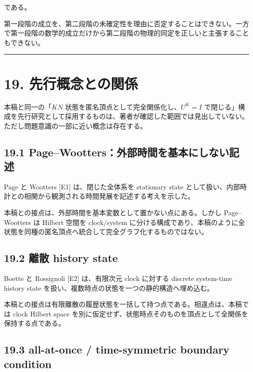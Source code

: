 \documentclass[
  a4paper,
]{ltjsarticle}
\begin{document}
である。

第一段階の成立を、第二段階の未確定性を理由に否定することはできない。一方で第一段階の数学的成立だけから第二段階の物理的同定を正しいと主張することもできない。

\begin{center}\rule{0.5\linewidth}{0.5pt}\end{center}

\section{19.
先行概念との関係}\label{ux5148ux884cux6982ux5ff5ux3068ux306eux95a2ux4fc2}

本稿と同一の「\(KN\) 状態を匿名頂点として完全関係化し、\(U^K=I\)
で閉じる」構成を先行研究として採用するものは、著者が確認した範囲では見出していない。ただし問題意識の一部に近い概念は存在する。

\subsection{19.1
Page--Wootters：外部時間を基本にしない記述}\label{pagewoottersux5916ux90e8ux6642ux9593ux3092ux57faux672cux306bux3057ux306aux3044ux8a18ux8ff0}

Page と Wootters {[}E1{]} は、閉じた全体系を stationary state
として扱い、内部時計との相関から観測される時間発展を記述する考えを示した。

本稿との接点は、外部時間を基本変数として置かない点にある。しかし
Page--Wootters は Hilbert 空間を clock/system
に分ける構成であり、本稿のように全状態を同種の匿名頂点へ統合して完全グラフ化するものではない。

\subsection{19.2 離散 history state}\label{ux96e2ux6563-history-state}

Boette と Rossignoli {[}E2{]} は、有限次元 clock に対する discrete
system-time history state
を扱い、複数時点の状態を一つの静的構造へ埋め込む。

本稿との接点は有限離散の履歴状態を一括して持つ点である。相違点は、本稿では
clock Hilbert space
を別に仮定せず、状態時点そのものを頂点として全関係を保持する点である。

\subsection{19.3 all-at-once / time-symmetric boundary
condition}\label{all-at-once-time-symmetric-boundary-condition}
\end{document}
